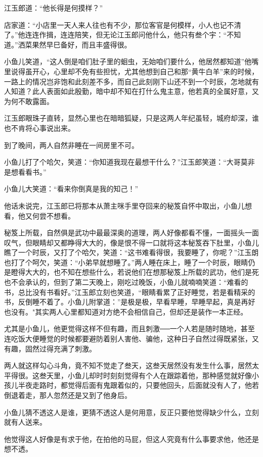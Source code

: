 \documentclass[12pt,oneside]{book}
\begin{document}
江玉郎道：``他长得是何摸样？''

店家道：``小店里一天人来人往也有不少，那位客官是何模样，小人也记不清了。''他连连作揖，连连陪笑，但无论江玉郎问他什么，他只有叁个宇：``不知道。''洒菜果然早巳备好，而且丰盛得很。

小鱼儿笑道，``这人倒是咱们肚子里的蛔虫，无始咱们要什么，他居然都知道''他嘴里说得虽开心，心里却不免有些担忧，尤其他想到自己和那``黄牛白羊''来的时候，一路上的情况岂非饱和此刻差不多，而自己此刻刚下山还不到一个时辰，怎地就有人知道？此人表面如此殷勤，暗中却不知在打什么鬼主意，他若真的全属好意，又为何不敢露面。

江玉郎眼珠子直转，显然心里也在暗暗狐疑，只是这两人年纪虽轻，城府却深，谁也不肯将心事说出来。

到了晚间，两人自然非睡在一间房里不可。

小鱼儿打了个哈欠，笑道：``你知道我现在最想干什么？''江玉郎笑道：``大哥莫非是想看看书。''

小鱼儿大笑道：``看来你倒真是我的知己！''

他话未说完，江玉郎已将那本从萧主咪手里夺回来的秘笈自怀中取出，小鱼儿想看，他又何尝不想看。

秘笈上所载，自然俱是武功中最最深奥的道理，两人好像都看不懂，一面摇头一面叹气，但眼睛却又都睁得大大的，像是恨不得一口就将这本秘笈吞下肚里，小鱼儿瞧了一个时辰，又打了个哈欠，笑道：``这书难看得很，我要睡了，你呢？''江玉朗也打了个呵欠，笑道：``小弟早就想睡了。''两人睡在床上，睡了一个时辰，眼睛仍是瞪得大大的，也不知在想些什么，若说他们在想那秘笈上所载的武功，他们是死也不会承认的，但到了第二天晚上，刚吃过晚饭，小鱼儿就喃喃笑道：``难看的书，总比没有书看好。''江玉郎立刻也笑道，``眼睛看累了正好睡觉，若是看精采的书，反倒睡不着了。小鱼儿附掌道：''是极是极，早看早睡，早睡早起，真是再好也没有。"其实两人心里都知道对方绝不会相信自己，但却还是装作一本正经。

尤其是小鱼儿，他更觉得这样不但有趣，而且刺激──一个人若是随时随地，甚至连吃饭大便睡觉的时候都要避防着别人害他、骗他，这种日子自然过得既紧张，又有趣，固然过得充满了刺激。

两人就这样勾心斗角，竟不知不觉走了叁天，这叁天居然没有发生什么事，居然太平得很。这叁天里，小鱼儿却时时刻刻觉得有个人在跟踪着他，那种感觉就好像小孩儿半夜走路时，都觉得后面有鬼跟着似的，只要他回头，后面就没有人了，他若倒退着走，那人忽然还是又到了他身后。

小鱼儿猜不透这人是谁，更猜不透这人是何用意，反正只要他觉得缺少什么，立刻就有人送来。

他觉得这人好像是有求于他，在拍他的马屁，但这人究竟有什么事要求他，他还是想不透。
\end{document}
